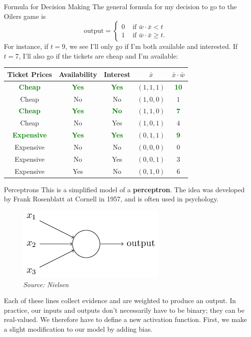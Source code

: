 \documentclass[xcolor=dvipsnames, fontsize=11pt, %
pagesize, %
parskip=half-, t]{beamer}
\begin{document}
\begin{frame}{Formula for Decision Making}
The general formula for my decision to go to the Oilers game is $$\text{output}=\begin{cases} 0 & \text{ if } \bar{w}\cdot \bar{x}<t \\ 
1 & \text{ if } \bar{w}\cdot \bar{x}\ge t. \end{cases}$$ \pause 
For instance, if $t=9$, we see I'll only go if I'm both available and interested. \pause If $t=7$, I'll also go if the tickets are cheap and I'm available:
\begin{table} 
\center 
\begin{tabular}{cccc|c}
Ticket Prices & Availability & Interest & $\bar{x}$ & $\bar{x}\cdot \bar{w}$ \\ \hline 
\textbf{\textcolor{Green}{Cheap}} & \textbf{\textcolor{Green}{Yes}} & \textbf{\textcolor{Green}{Yes}} & $(1,1,1)$ & \textbf{\textcolor{Green}{10}} \\
Cheap & No & No & $(1,0,0)$ & $1$ \\
\textbf{\textcolor{Green}{Cheap }}& \textbf{\textcolor{Green}{Yes }}& \textbf{\textcolor{Green}{No}} & $(1,1,0)$ & \textbf{\textcolor{Green}{7}} \\
Cheap & No & Yes & $(1,0,1)$ & $4$   \\
\textbf{\textcolor{Green}{Expensive}} & \textbf{\textcolor{Green}{Yes}} & \textbf{\textcolor{Green}{Yes}} & $(0,1,1)$ & \textbf{\textcolor{Green}{9}} \\
Expensive & No & No & $(0,0,0)$  & $0$ \\
Expensive & No & Yes & $(0,0,1)$ & $3$\\
Expensive & Yes & No & $(0,1,0)$ & $6$
\end{tabular}
\end{table}
\end{frame}
\begin{frame}{Perceptrons}
This is a simplified model of a \textbf{perceptron}. The idea was developed by Frank Rosenblatt at Cornell in 1957, and is often used in psychology. \pause 

\begin{figure}
\center
\includegraphics[scale=0.66]{perc.png}
\caption{\textit{Source: Nielsen}}
\end{figure} \pause
\vspace{0.05\textheight} 
Each of these lines collect evidence and are weighted to produce an output. \pause In practice, our inputs and outputs don't necessarily have to be binary; they can be real-valued. We therefore have to define a new activation function. \pause First, we make a slight modification to our model by adding bias.
\end{frame}
\end{document}
